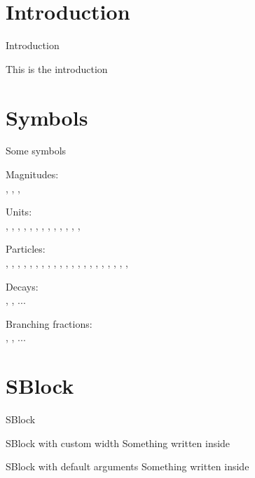 %
%
%


%
%
\section{Introduction}\label{sec:introduction}
\begin{frame}{Introduction}

  This is the introduction

\end{frame}

%
%
\section{Symbols}\label{sec:symbols}
\begin{frame}{Some symbols}

 Magnitudes:\\
 \energy, \DOCA, \IP, \pt

 Units:\\
 \MeV, \MeVc, \MeVcc, \GeVcc, \TeVcc, \m, \cm, \mm, \fb, \ifb,
 \CL, \Hz, \MHz, \s

 Particles:\\
 \elp, \elm, \mup, \mum, \taup, \taum, \pip, \pim, \Ks, \Kl, \Kp, \Km, \Kpm,
 \Sigmap, \Lz, \Dpm, \Lcpm, \Bd, \Bs, \Bcpm, \Lb, \Az

 Decays:\\
 \decay{\Ks}{\mup\mum}, \decay{\Bs}{\mup\mum}, ...

 Branching fractions:\\
 \brof{\decay{\Ks}{\mup\mum}}, \brof{\decay{\Bs}{\mup\mum}}, ...
\end{frame}

%
%
\section{SBlock}\label{sec:sblock}
\begin{frame}{SBlock}
 \begin{sblock}[bgtitle=yellow,fgtitle=red,bgbody=yellow!30,fgbody=red!30,width=0.8\textwidth]{SBlock with custom width}
   Something written inside
 \end{sblock}

 \begin{sblock}{SBlock with default arguments}
   Something written inside
 \end{sblock}
\end{frame}

